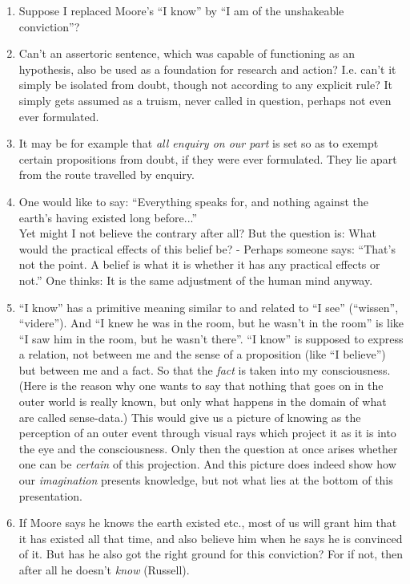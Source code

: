 \documentclass{book}
\begin{document}
\begin{enumerate}
\item
Suppose I replaced Moore's ``I know'' by ``I am of the unshakeable
conviction''?

\item
Can't an assertoric sentence, which was capable of functioning as an
hypothesis, also be used as a foundation for research and action? I.e. can't it
simply be isolated from doubt, though not according to any explicit rule? It
simply gets assumed as a truism, never called in question, perhaps not even
ever formulated.

\item
It may be for example that \emph{all enquiry on our part} is set so as to
exempt certain propositions from doubt, if they were ever formulated. They lie
apart from the route travelled by enquiry.

\item
One would like to say: ``Everything speaks for, and nothing against the earth's
having existed long before...'' \\
Yet might I not believe the contrary after all?  But the question is: What
would the practical effects of this belief be? - Perhaps someone says: ``That's
not the point. A belief is what it is whether it has any practical effects or
not.'' One thinks: It is the same adjustment of the human mind anyway.

\item
``I know'' has a primitive meaning similar to and related to ``I see''
(``wissen'', ``videre''). And ``I knew he was in the room, but he wasn't in the
room'' is like ``I saw him in the room, but he wasn't there''. ``I know'' is
supposed to express a relation, not between me and the sense of a proposition
(like ``I believe'') but between me and a fact. So that the \emph{fact} is
taken into my consciousness. (Here is the reason why one wants to say that
nothing that goes on in the outer world is really known, but only what happens
in the domain of what are called sense-data.) This would give us a picture of
knowing as the perception of an outer event through visual rays which project
it as it is into the eye and the consciousness. Only then the question at once
arises whether one can be \emph{certain} of this projection. And this picture
does indeed show how our \emph{imagination} presents knowledge, but not what
lies at the bottom of this presentation.

\item
If Moore says he knows the earth existed etc., most of us will grant him that
it has existed all that time, and also believe him when he says he is convinced
of it. But has he also got the right ground for this conviction? For if not,
then after all he doesn't \emph{know} (Russell).


\end{enumerate}
\end{document}

